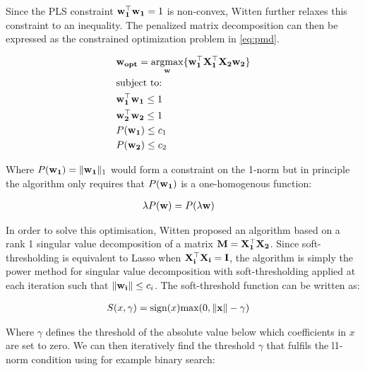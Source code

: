 Since the PLS constraint $\bold{w_1^{\top}w_1}=1$ is non-convex, Witten further relaxes this constraint to an inequality. The penalized matrix decomposition can then be expressed as the constrained optimization problem in \ref{eq:pmd}. 

\begin{align}
    \label{eq:pmd}
    & \bold{w_{opt}}=\underset{\bold{w}}{\mathrm{argmax}}\{ \bold{w_1^{\top}X_1^{\top}X_2w_2} \}\\
    & \text{subject to:} \notag\\
    & \bold{w_1^{\top}w_1}\leq1 \notag\\
    & \bold{w_2^{\top}w_2}\leq1 \notag\\
    & P(\bold{w_1})\leq c_1 \notag\\
    &P(\bold{w_2})\leq c_2 \notag
\end{align}

Where $P(\bold{w_1})=\|\bold{w_1}\|_1$ would form a constraint on the 1-norm but in principle the algorithm only requires that $P(\bold{w_1})$ is a one-homogenous function:

\begin{align}
    & \lambda P(\bold{w})=P(\lambda \bold{w})
\end{align}

In order to solve this optimisation, Witten proposed an algorithm based on a rank 1 singular value decomposition of a matrix $\bold{M}=\bold{X_1^{\top}X_2}$. Since soft-thresholding is equivalent to Lasso when $\bold{X_i^{\top}X_i}=\bold{I}$, the algorithm is simply the power method for singular value decomposition with soft-thresholding applied at each iteration such that $\|\bold{w_i}\| \leq c_i$. The soft-threshold function can be written as:

\begin{align}
    \label{eq:softthreshold}
    & S(x,\gamma) = \text{sign}(x)\text{max}(0,\|\bold{x}\|-\gamma)
\end{align}

Where $\gamma$ defines the threshold of the absolute value below which coefficients in $x$ are set to zero. We can then iteratively find the threshold $\gamma$ that fulfils the l1-norm condition using for example binary search:

